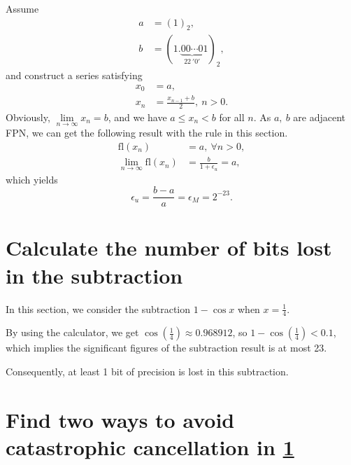 \documentclass[a4paper]{article}
\begin{document}
Assume 
\begin{equation}
    \begin{aligned}
        a &= (1)_2, \\
        b &= (1.\underbrace{00\cdots0}_{22\ '0'}1)_2,
    \end{aligned}
    \label{eq:5_x}
\end{equation}
and construct a series satisfying
\begin{equation}
    \begin{aligned}
        x_0 &= a, \\
        x_n &= \frac{x_{n-1} + b}{2},\ n > 0.
    \end{aligned}
    \label{eq:5_series}
\end{equation}
Obviously, $\lim\limits_{n\to\infty} x_n = b$, and we have $a \leqslant x_n < b$ for all $n$. As $a,\ b$ are adjacent FPN, we can get the following result with the rule in this section.
\begin{equation}
    \begin{aligned}
        \text{fl}(x_n) &= a,\ \forall n > 0, \\
        \lim_{n\to\infty} \text{fl}(x_n) &= \frac{b}{1 + \epsilon_u} = a,
    \end{aligned}
    \label{eq:5_fl_series}
\end{equation}
which yields
\begin{equation}
    \epsilon_u = \frac{b - a}{a} = \epsilon_M = 2^{-23}.
    \label{eq:5_unit_round_off}
\end{equation}

\section{Calculate the number of bits lost in the subtraction}
\label{sec:6}

In this section, we consider the subtraction $1 - \cos x$ when $x = \frac{1}{4}$.

By using the calculator, we get $\cos(\frac{1}{4}) \approx 0.968912$, so $1 - \cos(\frac{1}{4}) < 0.1$, which implies the significant figures of the subtraction result is at most 23. 

Consequently, at least 1 bit of precision is lost in this subtraction.

\section{Find two ways to avoid catastrophic cancellation in \cref{sec:6}}
\end{document}
